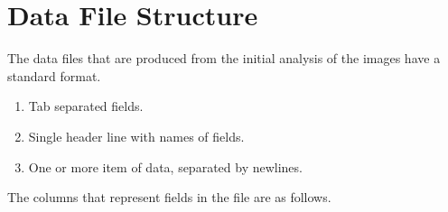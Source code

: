 
\section{Data File Structure}
\label{sec:data_file_structure}

The data files that are produced from the initial analysis of the images have a
standard format.

\begin{enumerate}
	\item Tab separated fields.
	\item Single header line with names of fields.
	\item One or more item of data, separated by newlines.
\end{enumerate}

The columns that represent fields in the file are as follows.

